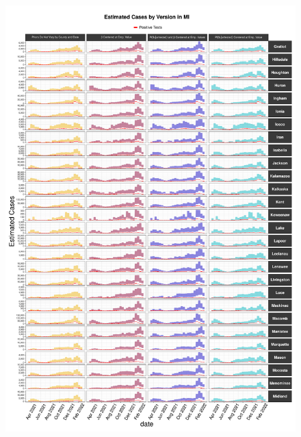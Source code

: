 \documentclass[12pt,twoside]{smiththesis}
\begin{document}
\begin{figure}
\includegraphics[width=1\linewidth]{figure/mi2_pb_compared_to_observed} \caption{\label{fig:pb_versions_mi}}\label{fig:unnamed-chunk-74-2}
\end{figure}
\end{document}
